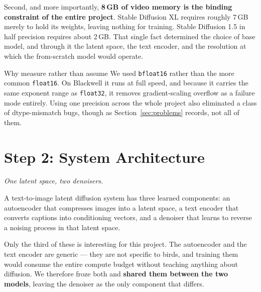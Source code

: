 \documentclass[11pt,a4paper]{article}
\newcommand{\step}[1]{\section{#1}}
\begin{document}
Second, and more importantly, \textbf{8\,GB of video memory is the binding
constraint of the entire project}. Stable Diffusion XL requires roughly 7\,GB
merely to hold its weights, leaving nothing for training. Stable Diffusion 1.5
in half precision requires about 2\,GB. That single fact determined the choice
of base model, and through it the latent space, the text encoder, and the
resolution at which the from-scratch model would operate.

\begin{lesson}{Why measure rather than assume}
We used \texttt{bfloat16} rather than the more common \texttt{float16}. On
Blackwell it runs at full speed, and because it carries the same exponent range
as \texttt{float32}, it removes gradient-scaling overflow as a failure mode
entirely. Using one precision across the whole project also eliminated a class
of dtype-mismatch bugs, though as Section~\ref{sec:problems} records, not all of
them.
\end{lesson}

\step{Step 2: System Architecture}
\label{sec:arch-ref}
\noindent\textit{One latent space, two denoisers.}\medskip

A text-to-image latent diffusion system has three learned components: an
autoencoder that compresses images into a latent space, a text encoder that
converts captions into conditioning vectors, and a denoiser that learns to
reverse a noising process in that latent space.

Only the third of these is interesting for this project. The autoencoder and the
text encoder are generic --- they are not specific to birds, and training them
would consume the entire compute budget without teaching anything about
diffusion. We therefore froze both and \textbf{shared them between the two
models}, leaving the denoiser as the only component that differs.
\end{document}
